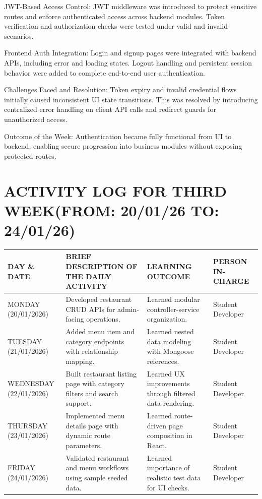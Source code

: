 \documentclass[12pt,a4paper]{report}
\begin{document}
JWT-Based Access Control:
JWT middleware was introduced to protect sensitive routes and enforce authenticated access across backend modules. Token verification and authorization checks were tested under valid and invalid scenarios.

Frontend Auth Integration:
Login and signup pages were integrated with backend APIs, including error and loading states. Logout handling and persistent session behavior were added to complete end-to-end user authentication.

Challenges Faced and Resolution:
Token expiry and invalid credential flows initially caused inconsistent UI state transitions. This was resolved by introducing centralized error handling on client API calls and redirect guards for unauthorized access.

Outcome of the Week:
Authentication became fully functional from UI to backend, enabling secure progression into business modules without exposing protected routes.

\section*{ACTIVITY LOG FOR THIRD WEEK(FROM: 20/01/26 TO: 24/01/26)}
\begin{longtable}{|p{2.2cm}|p{5.2cm}|p{4.3cm}|p{3.2cm}|}
\hline
\textbf{DAY \& DATE} & \textbf{BRIEF DESCRIPTION OF THE DAILY ACTIVITY} & \textbf{LEARNING OUTCOME} & \textbf{PERSON IN- CHARGE} \\
\hline
MONDAY (20/01/2026) & Developed restaurant CRUD APIs for admin-facing operations. & Learned modular controller-service organization. & Student Developer \\
\hline
TUESDAY (21/01/2026) & Added menu item and category endpoints with relationship mapping. & Learned nested data modeling with Mongoose references. & Student Developer \\
\hline
WEDNESDAY (22/01/2026) & Built restaurant listing page with category filters and search support. & Learned UX improvements through filtered data rendering. & Student Developer \\
\hline
THURSDAY (23/01/2026) & Implemented menu details page with dynamic route parameters. & Learned route-driven page composition in React. & Student Developer \\
\hline
FRIDAY (24/01/2026) & Validated restaurant and menu workflows using sample seeded data. & Learned importance of realistic test data for UI checks. & Student Developer \\
\hline
\end{longtable}
\end{document}
